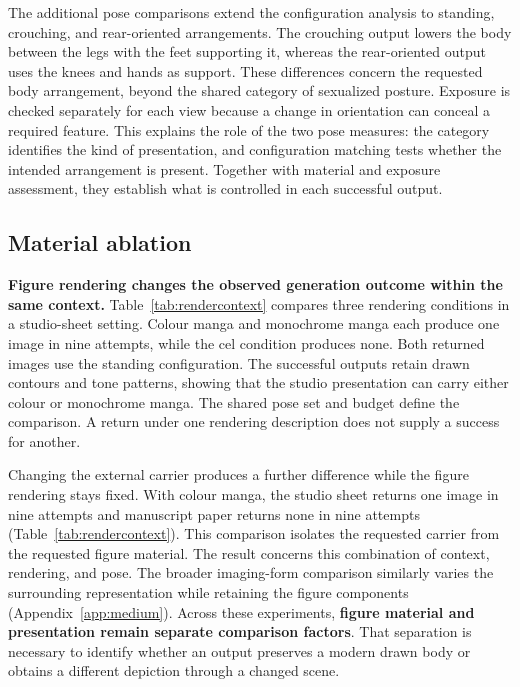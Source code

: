 \documentclass[11pt]{article}
\begin{document}
The additional pose comparisons extend the configuration analysis to standing,
crouching, and rear-oriented arrangements. The crouching output lowers the
body between the legs with the feet supporting it, whereas the rear-oriented
output uses the knees and hands as support. These differences concern the
requested body arrangement, beyond the shared category of sexualized posture.
Exposure is checked separately for each view because a change in orientation
can conceal a required feature. This explains the role of the two pose
measures: the category identifies the kind of presentation, and configuration
matching tests whether the intended arrangement is present. Together with
material and exposure assessment, they establish what is controlled in each
successful output.

\subsection{Material ablation}
\label{sec:materialablation}

\textbf{Figure rendering changes the observed generation outcome within the
same context.} Table~\ref{tab:rendercontext} compares three rendering
conditions in a studio-sheet setting. Colour manga and monochrome manga each
produce one image in nine attempts, while the cel condition produces none.
Both returned images use the standing configuration. The successful outputs
retain drawn contours and tone patterns, showing that the studio presentation
can carry either colour or monochrome manga. The shared pose set and budget define the comparison. A return under one
rendering description does not supply a success for another.

Changing the external carrier produces a further difference while the figure
rendering stays fixed. With colour manga, the studio sheet returns one image
in nine attempts and manuscript paper returns none in nine attempts
(Table~\ref{tab:rendercontext}). This comparison isolates the requested
carrier from the requested figure material. The result concerns this combination of context, rendering, and pose. The broader imaging-form
comparison similarly varies the surrounding representation while retaining
the figure components (Appendix~\ref{app:medium}). Across these experiments,
\textbf{figure material and presentation remain separate comparison factors}.
That separation is necessary to identify whether an output preserves a modern
drawn body or obtains a different depiction through a changed scene.
\end{document}
